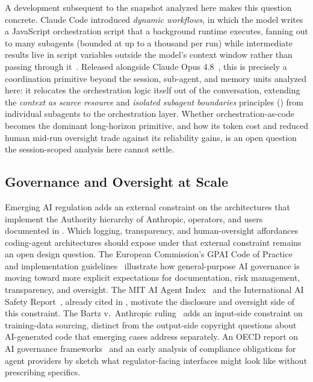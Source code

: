 \tierA{} A development subsequent to the  snapshot analyzed here makes this question concrete. Claude Code  introduced \emph{dynamic workflows}, in which the model writes a JavaScript orchestration script that a background runtime executes, fanning out to many subagents (bounded at up to a thousand per run) while intermediate results live in script variables outside the model's context window rather than passing through it~\citep{claudecode2026workflows}. Released alongside Claude Opus 4.8~\citep{anthropic2026opus48}, this is precisely a coordination primitive beyond the session, sub-agent, and memory units analyzed here: it relocates the orchestration logic itself out of the conversation, extending the \emph{context as scarce resource} and \emph{isolated subagent boundaries} principles () from individual subagents to the orchestration layer. Whether orchestration-as-code becomes the dominant long-horizon primitive, and how its token cost and reduced human mid-run oversight trade against its reliability gains, is an open question the session-scoped analysis here cannot settle.


\subsection{Governance and Oversight at Scale}
\label{sec:future:governance}

Emerging AI regulation adds an external constraint on the architectures that implement the Authority hierarchy of Anthropic, operators, and users documented in . Which logging, transparency, and human-oversight affordances coding-agent architectures should expose under that external constraint remains an open design question. The European Commission's GPAI Code of Practice~\citep{eugpai2025cop} and implementation guidelines~\citep{eugpai2025guidelines} illustrate how general-purpose AI governance is moving toward more explicit expectations for documentation, risk management, transparency, and oversight. The MIT AI Agent Index~\citep{staufer2026agentindex} and the International AI Safety Report~\citep{bengio2026safety}, already cited in , motivate the disclosure and oversight side of this constraint. The Bartz v.\ Anthropic ruling~\citep{bartzanthropic2025} adds an input-side constraint on training-data sourcing, distinct from the output-side copyright questions about AI-generated code that emerging cases address separately. An OECD report on AI governance frameworks~\citep{oecd2025governing} and an early analysis of compliance obligations for agent providers by \citet{nannini2026agentlaw} sketch what regulator-facing interfaces might look like without prescribing specifics.

